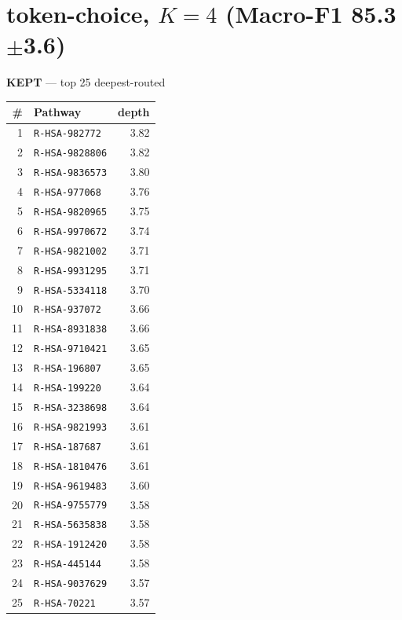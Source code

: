 \documentclass[10pt]{article}
\begin{document}
\section*{token-choice, $K=4$  (Macro-F1 85.3$\pm$3.6)}
\filbreak
\begin{minipage}[t]{0.48\textwidth}\centering\textbf{\color{green!45!black}KEPT} --- top 25 deepest-routed\\[3pt]
\begin{tabular}{@{}r l r@{}}
\toprule
\# & Pathway & depth \\
\midrule
1 & \texttt{R-HSA-982772} & 3.82 \\
2 & \texttt{R-HSA-9828806} & 3.82 \\
3 & \texttt{R-HSA-9836573} & 3.80 \\
4 & \texttt{R-HSA-977068} & 3.76 \\
5 & \texttt{R-HSA-9820965} & 3.75 \\
6 & \texttt{R-HSA-9970672} & 3.74 \\
7 & \texttt{R-HSA-9821002} & 3.71 \\
8 & \texttt{R-HSA-9931295} & 3.71 \\
9 & \texttt{R-HSA-5334118} & 3.70 \\
10 & \texttt{R-HSA-937072} & 3.66 \\
11 & \texttt{R-HSA-8931838} & 3.66 \\
12 & \texttt{R-HSA-9710421} & 3.65 \\
13 & \texttt{R-HSA-196807} & 3.65 \\
14 & \texttt{R-HSA-199220} & 3.64 \\
15 & \texttt{R-HSA-3238698} & 3.64 \\
16 & \texttt{R-HSA-9821993} & 3.61 \\
17 & \texttt{R-HSA-187687} & 3.61 \\
18 & \texttt{R-HSA-1810476} & 3.61 \\
19 & \texttt{R-HSA-9619483} & 3.60 \\
20 & \texttt{R-HSA-9755779} & 3.58 \\
21 & \texttt{R-HSA-5635838} & 3.58 \\
22 & \texttt{R-HSA-1912420} & 3.58 \\
23 & \texttt{R-HSA-445144} & 3.58 \\
24 & \texttt{R-HSA-9037629} & 3.57 \\
25 & \texttt{R-HSA-70221} & 3.57 \\
\bottomrule
\end{tabular}
\end{minipage}\hfill
\end{document}
